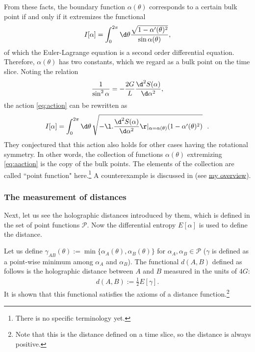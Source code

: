 \documentclass[12pt]{article}
\begin{document}
From these facts, the boundary function $\alpha(\theta)$ corresponds to a certain bulk point 
if and only if it extremizes the functional
\begin{align}
	I[\alpha] = \int_0^{2\pi}\d\theta \frac{\sqrt{1-\alpha'(\theta)^2}}{\sin\alpha(\theta)},\label{eq:action}
\end{align}
of which the Euler-Lagrange equation is a second order differential equation.
Therefore, $\alpha(\theta)$ has two constants, which we regard as a bulk point on the time slice.
Noting the relation
\begin{align}
	\frac{1}{\sin^2\alpha} = -\frac{2G}{L}\frac{\d^2S(\alpha)}{\d\alpha^2},
\end{align}
the action \eqref{eq:action} can be rewritten as 
\begin{align}
	I[\alpha] = \int_0^{2\pi}\d\theta\,\sqrt{-\l.\frac{\d^2S(\alpha)}{\d\alpha^2}\r|_{\alpha = \alpha(\theta)}(1-\alpha'(\theta)^2)}~~.\label{eq:aaction}
\end{align}
They conjectured that this action also holds for other cases having the rotational symmetry.
In other words, the collection of functions $\alpha(\theta)$ extremizing \eqref{eq:aaction} is the copy of the bulk points.
The elements of the collection are called ``point function" here.\footnote{There is no specific terminology yet.}
A counterexample is discussed in \cite{Burda:2018rpb} 
(see \href{https://albertmcc.github.io/web/reviews/holographic_bubble.pdf}{\color{blue}my overview}).

\subsubsection*{The measurement of distances}

Next, let us see the holographic distances introduced by them, which is defined in the set of point functions $\mathcal P$.
Now the differential entropy $E[\alpha]$ is used to define the distance.

Let us define $\gamma_{AB}(\theta) := \min\{\alpha_A(\theta),\alpha_B(\theta)\}$ for $\alpha_A,\alpha_B\in\mathcal P$ 
($\gamma$ is defined as a point-wise minimum among $\alpha_A$ and $\alpha_B$).
The functional $d(A,B)$ defined as follows is the holographic distance between 
$A$ and $B$ measured in the units of $4G$:
\begin{align}
	d(A,B) := \frac{1}{2}E[\gamma].\label{eq:dist}
\end{align}
It is shown that this functional satisfies the axioms of a distance function.\footnote{
Note that this is the distance defined on a time slice, so the distance is always positive.}
\end{document}

